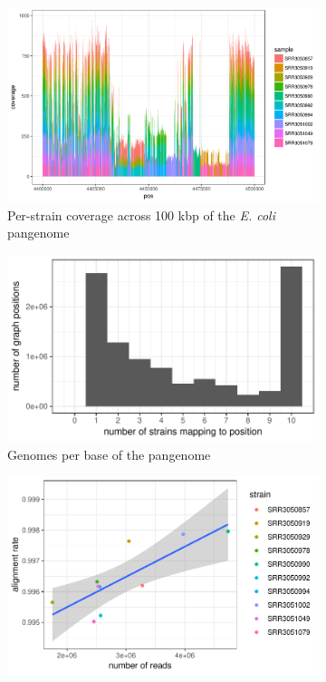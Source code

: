 \documentclass[a4paper,12pt,numbered,oneside]{Classes/PhDThesisPSnPDF}
\begin{document}
\begin{figure}[htbp!]
  \centering
  \begin{subfigure}[t]{1.0\textwidth}
    \includegraphics[width=1.0\textwidth]{Chapter3/Figs/ecoli_10strain_cov_col_pos_4400000_100k.png}
    \caption{Per-strain coverage across 100 kbp of the \emph{E. coli} pangenome}
    \label{subfig:ecoli_cov_100k}
  \end{subfigure}
  \begin{subfigure}[t]{0.49\textwidth}
    \includegraphics[width=1.0\textwidth]{Chapter3/Figs/ecoli_cov_strains_hist.pdf}
    \caption{Genomes per base of the pangenome}
    \label{subfig:ecoli_cov_strains}
  \end{subfigure}
  \begin{subfigure}[t]{0.49\textwidth}
    \includegraphics[width=1.0\textwidth]{Chapter3/Figs/ecoli_pangenome_alignment_rate_vs_depth.pdf}

\end{subfigure}
\end{figure}
\end{document}
